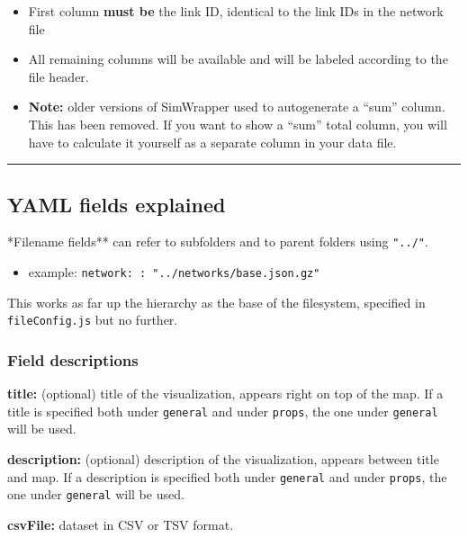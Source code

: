 \begin{itemize}
\tightlist
\item
  First column \textbf{must be} the link ID, identical to the link IDs
  in the network file
\item
  All remaining columns will be available and will be labeled according
  to the file header.
\item
  \textbf{Note:} older versions of SimWrapper used to autogenerate a
  ``sum'' column. This has been removed. If you want to show a ``sum''
  total column, you will have to calculate it yourself as a separate
  column in your data file.
\end{itemize}

\begin{center}\rule{0.5\linewidth}{0.5pt}\end{center}

\hypertarget{yaml-fields-explained}{%
\subsection{YAML fields explained}}

*Filename fields** can refer to subfolders and to parent folders using
\texttt{"../"}.

\begin{itemize}
\tightlist
\item
  example: \texttt{network:\ :\ "../networks/base.json.gz"}
\end{itemize}

This works as far up the hierarchy as the base of the filesystem,
specified in \texttt{fileConfig.js} but no further.

\hypertarget{field-descriptions}{%
\subsubsection{Field descriptions}\label{field-descriptions}}

\textbf{title:} (optional) title of the visualization, appears right on
top of the map. If a title is specified both under \texttt{general} and
under \texttt{props}, the one under \texttt{general} will be used.

\noindent\textbf{description:} (optional) description of the visualization,
appears between title and map. If a description is specified both under
\texttt{general} and under \texttt{props}, the one under
\texttt{general} will be used.

\noindent\textbf{csvFile:} dataset in CSV or TSV format.

